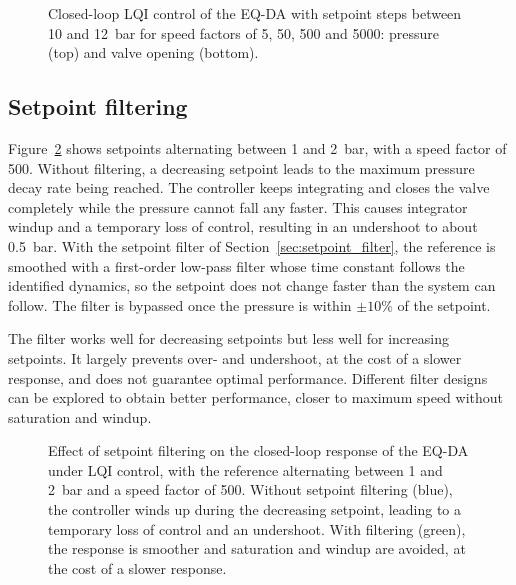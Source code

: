 \documentclass[12pt,a4paper]{article}
\begin{document}
\begin{figure}[ht!]
    \centering
    
    \caption{Closed-loop LQI control of the EQ-DA with setpoint steps between 10 and 12~bar for speed factors of 5, 50, 500 and 5000: pressure (top) and valve opening (bottom).}
    \label{fig:multiple_setpoints}
\end{figure}

\clearpage
\subsection{Setpoint filtering}
Figure~\ref{fig:setpoint_filtering} shows setpoints alternating between 1 and 2~bar, with a speed factor of 500. Without filtering, a decreasing setpoint leads to the maximum pressure decay rate being reached. The controller keeps integrating and closes the valve completely while the pressure cannot fall any faster. This causes integrator windup and a temporary loss of control, resulting in an undershoot to about 0.5~bar. With the setpoint filter of Section~\ref{sec:setpoint_filter}, the reference is smoothed with a first-order low-pass filter whose time constant follows the identified dynamics, so the setpoint does not change faster than the system can follow. The filter is bypassed once the pressure is within $\pm10\%$ of the setpoint.

The filter works well for decreasing setpoints but less well for increasing setpoints. It largely prevents over- and undershoot, at the cost of a slower response, and does not guarantee optimal performance. Different filter designs can be explored to obtain better performance, closer to maximum speed without saturation and windup.

\begin{figure}[ht!]
    \centering
    
    \caption{Effect of setpoint filtering on the closed-loop response of the EQ-DA under LQI control, with the reference alternating between 1 and 2~bar and a speed factor of 500. Without setpoint filtering (blue), the controller winds up during the decreasing setpoint, leading to a temporary loss of control and an undershoot. With filtering (green), the response is smoother and saturation and windup are avoided, at the cost of a slower response.}
    \label{fig:setpoint_filtering}
\end{figure}

\end{document}
